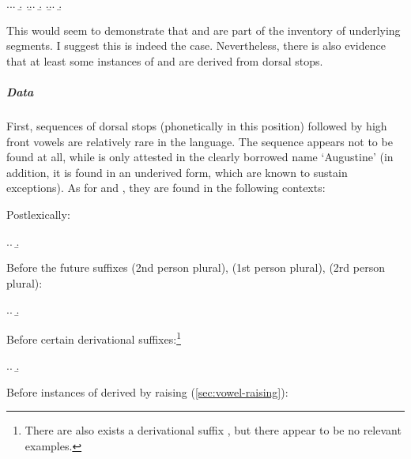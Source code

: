 \ex.\label{ex:postalveolar-contrasts}\a.\a.
\b.
\z.\b.\a.
\b.
\z.\b.\a.
\b.

This would seem to demonstrate that \ipa{[ʧ]} and \ipa{[dʒ]} are part of the inventory of underlying segments. I suggest this is indeed the case. Nevertheless, there is also evidence that at least some instances of \ipa{[ʧ]} and \ipa{[dʒ]} are derived from dorsal stops.

\subparagraph{Data}
\label{sec:data-1}

First, sequences of dorsal stops \ipa{[k~ɡ]} (phonetically  in this position) followed by high front vowels \ipa{[i~y]} are relatively rare in the language. The sequence \ipa{[ky]} appears not to be found at all, while \ipa{[ɡy]} is only attested in the clearly borrowed name \ipa{[ɔɡysˈtiːn]} `Augustine' (in addition, it is found in an underived form, which are known to sustain exceptions). As for \ipa{[ki]} and \ipa{[ɡi]}, they are found in the following contexts:

\begin{itemize*}
\item Postlexically:
\end{itemize*}

\ex.\a.
\b.

\begin{itemize*}
\item Before the future suffixes  (2nd person plural),  (1st person plural),  (2rd person plural):
\end{itemize*}

\ex.\a.
\b.

\begin{itemize*}
  \item Before certain derivational suffixes:\footnote{There are also exists a derivational suffix , but there appear to be no relevant examples.}
\end{itemize*}

\ex.\a.
\b.

\begin{itemize*}
  \item Before instances of \ipa{[i]} derived by raising (\cref{sec:vowel-raising}):
\end{itemize*}

